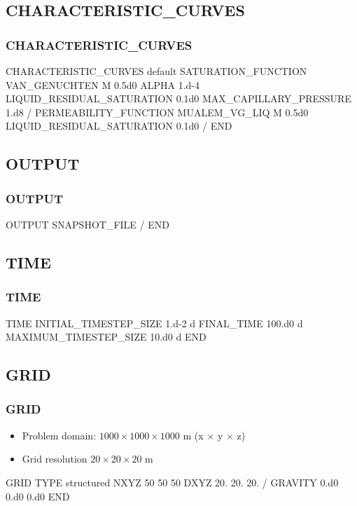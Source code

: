 \documentclass{beamer}
\begin{document}
\subsection{CHARACTERISTIC\_CURVES}
\begin{frame}\frametitle{CHARACTERISTIC\_CURVES}
	\begin{semiverbatim}
		CHARACTERISTIC_CURVES default
		  SATURATION_FUNCTION VAN_GENUCHTEN
		    M 0.5d0
		    ALPHA  1.d-4
		    LIQUID_RESIDUAL_SATURATION 0.1d0
		    MAX_CAPILLARY_PRESSURE 1.d8
		  /
		  PERMEABILITY_FUNCTION MUALEM_VG_LIQ
		    M 0.5d0
		    LIQUID_RESIDUAL_SATURATION 0.1d0
		  /
		END
	\end{semiverbatim}
\end{frame}

\subsection{OUTPUT}
\begin{frame}\frametitle{OUTPUT}
	\begin{semiverbatim}
		OUTPUT
		  SNAPSHOT_FILE
		  /
		END
	\end{semiverbatim}
\end{frame}

\subsection{TIME}
\begin{frame}\frametitle{TIME}
	\begin{semiverbatim}
TIME
  INITIAL_TIMESTEP_SIZE  1.d-2 d
  FINAL_TIME 100.d0 d
  MAXIMUM_TIMESTEP_SIZE 10.d0 d
END
	\end{semiverbatim}
\end{frame}

\subsection{GRID}
\begin{frame}\frametitle{GRID}

\begin{itemize}
  \item Problem domain: $1000 \times 1000 \times 1000$ m (x $\times$ y $\times$ z)
  \item Grid resolution $20 \times 20 \times 20$ m
\end{itemize}

\begin{semiverbatim}
GRID
  TYPE structured
  NXYZ 50 50 50
  DXYZ
    20.
    20.
    20.
  /
  GRAVITY 0.d0 0.d0 0.d0
END
\end{semiverbatim}

\end{frame}
\end{document}
